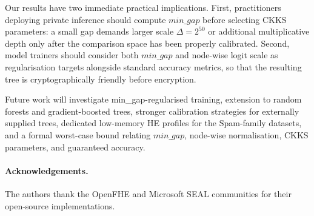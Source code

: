 \documentclass[runningheads]{llncs}
\begin{document}
Our results have two immediate practical implications.  First,
practitioners deploying private inference should compute $\mathit{min\_gap}$
before selecting CKKS parameters: a small gap demands larger scale
$\Delta = 2^{50}$ or additional multiplicative depth only after the
comparison space has been properly calibrated.  Second, model trainers should
consider both $\mathit{min\_gap}$ and node-wise logit scale as regularisation
targets alongside standard accuracy metrics, so that the resulting tree is
cryptographically friendly before encryption.

Future work will investigate min\_gap-regularised training, extension to
random forests and gradient-boosted trees, stronger calibration strategies
for externally supplied trees, dedicated low-memory HE profiles for the
Spam-family datasets, and a formal worst-case bound relating
$\mathit{min\_gap}$, node-wise normalisation, CKKS parameters, and
guaranteed accuracy.

\paragraph{Acknowledgements.}
The authors thank the OpenFHE and Microsoft SEAL communities for their
open-source implementations.
\end{document}
